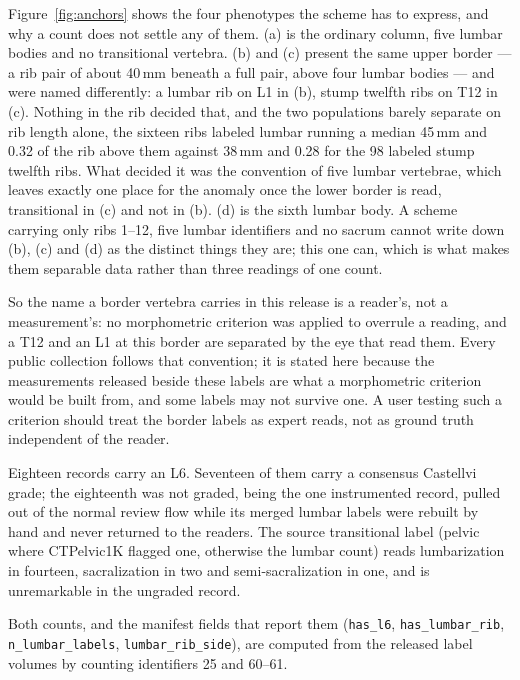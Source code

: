 \documentclass[aapm,mph,amsmath,amssymb,reprint]{revtex4-2}
\begin{document}
Figure~\ref{fig:anchors} shows the four phenotypes the scheme has to express, and why a count
does not settle any of them. (a) is the ordinary column, five lumbar bodies and no transitional
vertebra. (b) and (c) present the same upper border --- a rib pair of about 40\,mm beneath a
full pair, above four lumbar bodies --- and were named differently: a lumbar rib on L1 in (b),
stump twelfth ribs on T12 in (c). Nothing in the rib decided that, and the two populations
barely separate on rib length alone, the sixteen ribs labeled lumbar running a median 45\,mm
and 0.32 of the rib above them against 38\,mm and 0.28 for the 98 labeled stump twelfth ribs.
What decided it was the convention of five lumbar vertebrae, which leaves exactly one place for
the anomaly once the lower border is read, transitional in (c) and not in (b). (d) is the
sixth lumbar body. A scheme carrying only ribs 1--12, five lumbar identifiers and no sacrum
cannot write down (b), (c) and (d) as the distinct things they are; this one can, which is what
makes them separable data rather than three readings of one count.

So the name a border vertebra carries in this release is a reader's, not a measurement's: no
morphometric criterion was applied to overrule a reading, and a T12 and an L1 at this border
are separated by the eye that read them. Every public collection follows that convention; it
is stated here because the measurements released beside these labels are what a morphometric
criterion would be built from, and some labels may not survive one. A user testing such a
criterion should treat the border labels as expert reads, not as ground truth independent of
the reader.

Eighteen records carry an L6. Seventeen of them carry a consensus Castellvi grade;
the eighteenth was not graded, being the one instrumented record, pulled out of the normal
review flow while its merged lumbar labels were rebuilt by hand and never returned to the
readers. The source transitional label (pelvic where CTPelvic1K flagged one, otherwise the lumbar count) reads lumbarization in fourteen, sacralization in two and semi-sacralization in one, and is unremarkable in the ungraded record. \begin{sloppypar} Both counts, and the manifest fields that report them (\texttt{has\_l6},
\texttt{has\_lumbar\_rib}, \texttt{n\_lumbar\_labels}, \texttt{lumbar\_rib\_side}), are
computed from the released label volumes by counting identifiers 25 and 60--61.
\end{sloppypar}
\end{document}
